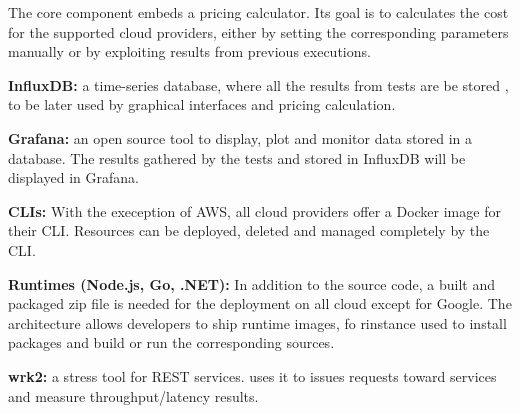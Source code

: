 The core component embeds a pricing calculator.
Its goal is to calculates the cost  for the supported cloud providers, either by setting the corresponding parameters manually or by exploiting results from previous executions.


\textbf{InfluxDB:} a time-series database, where all the results from tests are be stored , to be later used by graphical interfaces and pricing calculation.

\textbf{Grafana:} an open source tool to display, plot and monitor data stored in a database. 
The results gathered by the tests and stored in InfluxDB will be displayed in Grafana.

\textbf{CLIs:} With the exeception of AWS, all cloud providers offer a Docker image for their \gls{CLI}. 
Resources can be deployed, deleted and managed completely by the \gls{CLI}.

\textbf{Runtimes (Node.js, Go, .NET):} In addition to the source code, a built and packaged zip file is needed for the deployment on all cloud except for Google. 
The \sys architecture allows developers to ship runtime images, fo rinstance used to install packages and build or run the corresponding sources.


\textbf{wrk2:} a stress tool for REST services. \sys uses it to issues requests toward services and measure throughput/latency results.

